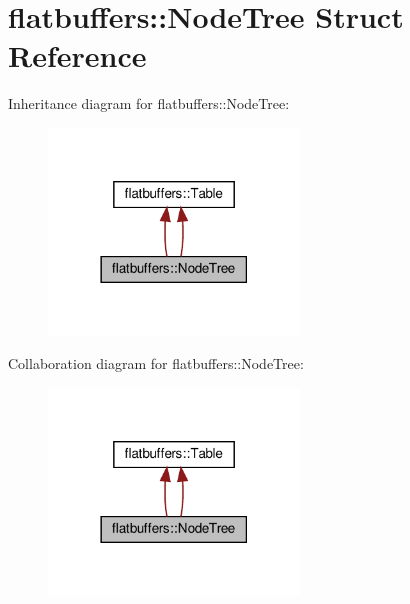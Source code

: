 \hypertarget{structflatbuffers_1_1NodeTree}{}\section{flatbuffers\+:\+:Node\+Tree Struct Reference}
\label{structflatbuffers_1_1NodeTree}


Inheritance diagram for flatbuffers\+:\+:Node\+Tree\+:
\nopagebreak
\begin{figure}[H]
\begin{center}
\leavevmode
\includegraphics[width=189pt]{structflatbuffers_1_1NodeTree__inherit__graph}
\end{center}
\end{figure}


Collaboration diagram for flatbuffers\+:\+:Node\+Tree\+:
\nopagebreak
\begin{figure}[H]
\begin{center}
\leavevmode
\includegraphics[width=189pt]{structflatbuffers_1_1NodeTree__coll__graph}
\end{center}
\end{figure}
